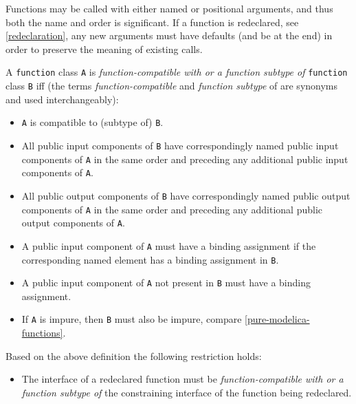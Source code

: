 \begin{nonnormative}
Functions may be called with either named or positional arguments, and thus both the name and order is significant.
If a function is redeclared, see \cref{redeclaration}, any new arguments must have defaults (and be at the end) in order to preserve the meaning of existing calls.
\end{nonnormative}

\begin{definition}\label{function-compatibility}
A \lstinline!function! class \lstinline!A! is \emph{function-compatible with or a function subtype of} \lstinline!function! class \lstinline!B! iff (the terms \emph{function-compatible} and \emph{function subtype} of are synonyms and used interchangeably):
\begin{itemize}
\item
  \lstinline!A! is compatible to (subtype of) \lstinline!B!.
\item
  All public input components of \lstinline!B! have correspondingly named public input components of \lstinline!A! in the same order and preceding any additional public input components of \lstinline!A!.
\item
  All public output components of \lstinline!B! have correspondingly named public output components of \lstinline!A! in the same order and preceding any additional public output components of \lstinline!A!.
\item
  A public input component of \lstinline!A! must have a binding assignment if the corresponding named element has a binding assignment in \lstinline!B!.
\item
  A public input component of \lstinline!A! not present in \lstinline!B! must have a binding assignment.
\item
  If \lstinline!A! is impure, then \lstinline!B! must also be impure, compare \cref{pure-modelica-functions}.
\end{itemize}
\end{definition}

Based on the above definition the following restriction holds:
\begin{itemize}
\item
  The interface of a redeclared function must be \emph{function-compatible with or a function subtype of} the constraining interface of the function being redeclared.
\end{itemize}

